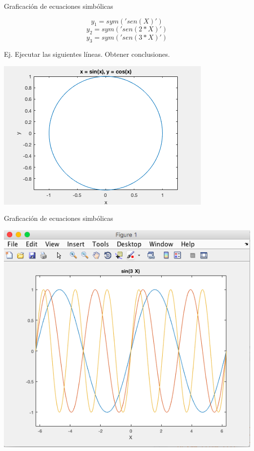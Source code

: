 \documentclass{bredelebeamer}
\begin{document}
\begin{frame}{Graficación de ecuaciones simbólicas}
\begin{center}
\begin{equation*}
y_1 = sym('sen(X)') 
\end{equation*}
\begin{equation*}
y_2 = sym('sen(2*X)') 
\end{equation*}
\begin{equation*}
y_3 = sym('sen(3*X)') 
\end{equation*}
\end{center}
Ej. Ejecutar las siguientes líneas. Obtener conclusiones.
\begin{center}
\includegraphics[scale=0.3]{images/fig4.png}
\end{center}
\end{frame}

\begin{frame}{Graficación de ecuaciones simbólicas}
\begin{center}
\includegraphics[scale=0.35]{images/fig5.png}
\end{center}
\end{frame}
\end{document}
